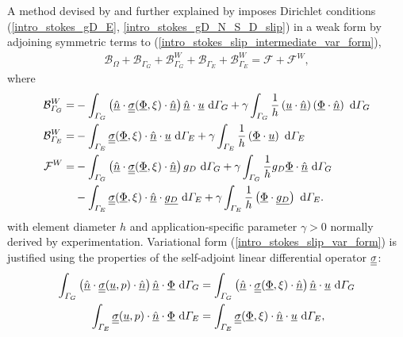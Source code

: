 A method devised by  \citet{nitsche_1970/71} and further explained by \citet{freund_1995} imposes Dirichlet conditions (\ref{intro_stokes_gD_E}, \ref{intro_stokes_gD_N_S_D_slip}) in a weak form by adjoining symmetric terms to (\ref{intro_stokes_slip_intermediate_var_form}),
\begin{align}
  \label{intro_stokes_slip_var_form}
  \mathcal{B}_{\Omega} + \mathcal{B}_{\Gamma_G} + \mathcal{B}_{\Gamma_G}^W + \mathcal{B}_{\Gamma_E} + \mathcal{B}_{\Gamma_E}^W = \mathcal{F} + \mathcal{F}^W,
\end{align}
where
{\footnotesize
\begin{align*}
  \mathcal{B}_{\varGamma_G}^W = &- \int_{\varGamma_G} \left( \underline{\hat{n}} \cdot \underline{\underline{\sigma}}(\underline{\Phi},\xi) \cdot \underline{\hat{n}} \right) \underline{\hat{n}} \cdot \underline{u}  \ \mathrm{d}\varGamma_G + \gamma \int_{\varGamma_G} \frac{1}{h} \left( \underline{u} \cdot \underline{\hat{n}} \right) \left( \underline{\Phi} \cdot \underline{\hat{n}} \right) \ \mathrm{d}\varGamma_G \\
  \mathcal{B}_{\varGamma_E}^W = &- \int_{\varGamma_E} \underline{\underline{\sigma}}(\underline{\Phi},\xi) \cdot \underline{\hat{n}} \cdot \underline{u} \ \mathrm{d}\varGamma_E + \gamma \int_{\varGamma_E} \frac{1}{h} \left( \underline{\Phi} \cdot \underline{u} \right) \ \mathrm{d}\varGamma_E \\
  \mathcal{F}^W = &- \int_{\varGamma_G} \left( \underline{\hat{n}} \cdot \underline{\underline{\sigma}}(\underline{\Phi},\xi) \cdot \underline{\hat{n}} \right) g_D \ \mathrm{d}\varGamma_G + \gamma \int_{\varGamma_G} \frac{1}{h} g_D \underline{\Phi} \cdot \underline{\hat{n}} \ \mathrm{d}\varGamma_G \\
  &- \int_{\varGamma_E} \underline{\underline{\sigma}}(\underline{\Phi},\xi) \cdot \underline{\hat{n}} \cdot \underline{g_D} \ \mathrm{d}\varGamma_E + \gamma \int_{\varGamma_E} \frac{1}{h} \left( \underline{\Phi} \cdot \underline{g_D} \right) \ \mathrm{d}\varGamma_E.
\end{align*}}
with element diameter $h$ and application-specific parameter $\gamma > 0$ normally derived by experimentation.  Variational form (\ref{intro_stokes_slip_var_form}) is justified using the properties of the self-adjoint linear differential operator $\underline{\underline{\sigma}}$:
\begin{align*}
  \int_{\varGamma_G} \left( \underline{\hat{n}} \cdot \underline{\underline{\sigma}}(\underline{u},p) \cdot \underline{\hat{n}} \right) \underline{\hat{n}} \cdot \underline{\Phi} \ \mathrm{d}\varGamma_G &= \int_{\varGamma_G} \left( \underline{\hat{n}} \cdot \underline{\underline{\sigma}}(\underline{\Phi},\xi) \cdot \underline{\hat{n}} \right) \underline{\hat{n}} \cdot \underline{u}  \ \mathrm{d}\varGamma_G \\
  \int_{\varGamma_E} \underline{\underline{\sigma}}(\underline{u},p) \cdot \underline{\hat{n}} \cdot \underline{\Phi} \ \mathrm{d}\varGamma_E &= \int_{\varGamma_E} \underline{\underline{\sigma}}(\underline{\Phi},\xi) \cdot \underline{\hat{n}} \cdot \underline{u} \ \mathrm{d}\varGamma_E,
\end{align*}
